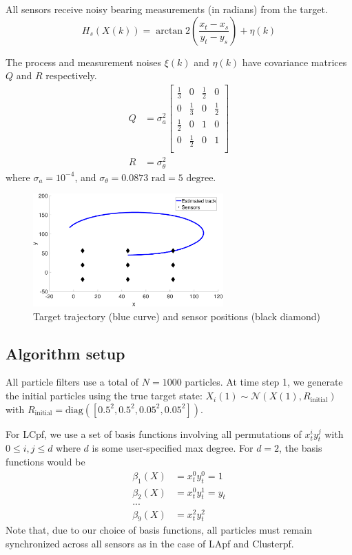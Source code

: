 \documentclass[10pt,letterpaper,final]{article}
\begin{document}
All sensors receive noisy bearing measurements (in radians) from the target.
\begin{equation}
H_s(X(k))= \arctan2 \left( \frac{x_t-x_s}{y_t-y_s} \right) + \eta(k)
\end{equation}

The process and measurement noises $\xi(k)$ and $\eta(k)$ have covariance matrices $Q$ and $R$ respectively.
\begin{align}
Q &= \sigma_a^2
\left[
\begin{array}{cccc}
\frac{1}{3} & 0 & \frac{1}{2} & 0 \\
0 & \frac{1}{3} & 0 & \frac{1}{2} \\
\frac{1}{2} & 0 & 1 & 0 \\
0 & \frac{1}{2} & 0 & 1 \\
\end{array}
\right]\\
R &= \sigma_{\theta}^2
\end{align}
where $\sigma_a=10^{-4}$, and $\sigma_{\theta}=0.0873\text{ rad} = 5 \text{ degree}$.

\begin{figure}
\centering
\includegraphics[width=0.65\textwidth]{Figures/track}
\caption{Target trajectory (blue curve) and sensor positions (black diamond)}
\label{fig:track}
\end{figure}

\subsection{Algorithm setup}
All particle filters use a total of $N=1000$ particles. At time step 1, we generate the initial particles using the true target state: $X_i(1) \sim \mathcal{N}(X(1), R_{\text{initial}})$ with $R_{\text{initial}}=\text{diag}([0.5^2,0.5^2,0.05^2,0.05^2])$. 

For LCpf, we use a set of basis functions involving all permutations of $x_t^iy_t^j$ with $0\leq i, j \leq d$ where $d$ is some user-specified max degree. For $d=2$, the basis functions would be
\begin{align*}
\beta_1(X) &= x_t^0 y_t^0 = 1 \\
\beta_2(X) &= x_t^0 y_t^1 = y_t \\
... \\
\beta_9(X) &= x_t^2 y_t^2 
\end{align*}
Note that, due to our choice of basis functions, all particles must remain synchronized across all sensors as in the case of LApf and Clusterpf. 
\end{document}
